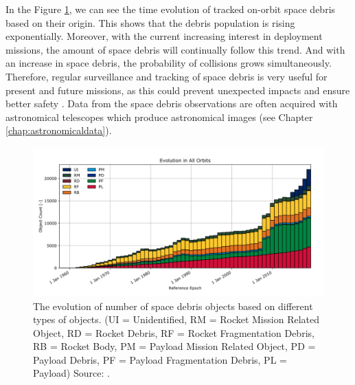 In the Figure \ref{img:esaspacedebrisreport}, we can see the time evolution of tracked on-orbit space debris based on their origin. This shows that the debris population is rising exponentially. Moreover, with the current increasing interest in deployment missions, the amount of space debris will continually follow this trend. And with an increase in space debris, the probability of collisions grows simultaneously. Therefore, regular surveillance and tracking of space debris is very useful for present and future missions, as this could prevent unexpected impacts and ensure better safety \cite{ESAarticle2}. Data from the space debris observations are often acquired with astronomical telescopes which produce astronomical images (see Chapter \ref{chap:astronomicaldata}). 

\begin{figure}[h]
    \centering
    \includegraphics[width=\textwidth]{images/ESA.png}
    \caption[The evolution of number of space debris objects based on different types of objects.]
    {The evolution of number of space debris objects based on different types of objects.
    (UI = Unidentified, RM = Rocket Mission Related Object, RD = Rocket Debris, RF = Rocket Fragmentation Debris, RB = Rocket Body, PM = Payload Mission Related Object, PD = Payload Debris, PF = Payload Fragmentation Debris, PL = Payload) Source: \cite{ESAarticle2}.}
    \label{img:esaspacedebrisreport}
\end{figure}




 
    
    
    
    

